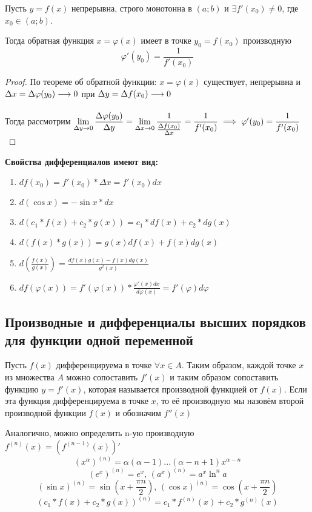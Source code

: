 \begin{theorem}
    Пусть $y = f(x)$ непрерывна, строго монотонна в $(a; b)$ и
    $\exists f'(x_0) \ne 0$, где $x_0 \in (a; b)$.

    Тогда обратная функция $x = \varphi (x)$ имеет в точке $y_0 = f(x_0)$ производную
    \[ \varphi' (y_0) = \frac{1}{f'(x_0)} \]
\end{theorem}
\begin{proof}
    По теореме об обратной функции: $x= \varphi (x)$ существует, непрерывна и
    $\Delta x = \Delta \varphi (y_0) \underset{}{\longrightarrow} 0$ при $\Delta y = \Delta f(x_0) \underset{}{\longrightarrow} 0$

    Тогда рассмотрим $\displaystyle\lim_{\Delta y \to 0} \frac{\Delta \varphi (y_0)}{\Delta y} =
    \displaystyle\lim_{\Delta x \to 0} \frac{1}{\frac{\Delta f(x_0)}{\Delta x}} = \frac{1}{f'(x_0)}
    \implies \varphi'(y_0) = \frac{1}{f'(x_0)}$
\end{proof}




\textbf{Свойства дифференциалов имеют вид:}
\begin{enumerate}
    \item $df(x_0) = f'(x_0)*\Delta x = f'(x_0)dx$
    \item $d(\cos x) = -\sin x * dx$
    \item $d(c_1*f(x) + c_2*g(x)) = c_1*df(x) + c_2*dg(x)$
    \item $d(f(x)*g(x)) = g(x)df(x) + f(x)dg(x)$
    \item $d(\frac{f(x)}{g(x)}) = \frac{df(x)g(x) - f(x)dg(x)}{g^2(x)}$
    \item $df(\varphi(x)) = f'(\varphi(x)) * \frac{\varphi'(x)dx}{d\varphi(x)} = f'(\varphi)d\varphi$
\end{enumerate}


\subsection{Производные и дифференциалы высших порядков для функции одной переменной}
\begin{definition}
    Пусть $f(x)$ дифференцируема в точке $\forall x \in A$. Таким образом, каждой точке $x$ из множества $A$ можно
    сопоставить $f'(x)$ и таким образом сопоставить функцию $y = f'(x)$, которая называется производной функцией от $f(x)$.
    Если эта функция дифференцируема в точке $x$, то её производную мы назовём второй производной функции $f(x)$ и обозначим $f''(x)$
    
    Аналогично, можно определить n-ую производную $f^{(n)}(x) = (f^{(n-1)}(x))'$
    \[(x^\alpha)^{(n)} = \alpha(\alpha-1)...(\alpha-n+1)x^{\alpha-n}\]
    \[(e^x)^{(n)} = e^x, \, (a^x)^{(n)} = a^x \ln^n a\]
    \[(\sin x)^{(n)} = \sin(x+\frac{\pi n}{2}), \, (\cos x)^{(n)} = \cos (x + \frac{\pi n}{2})\]
    \[(c_1*f(x) + c_2*g(x))^{(n)} = c_1*f^{(n)}(x) + c_2*g^{(n)}(x)\]
\end{definition}



